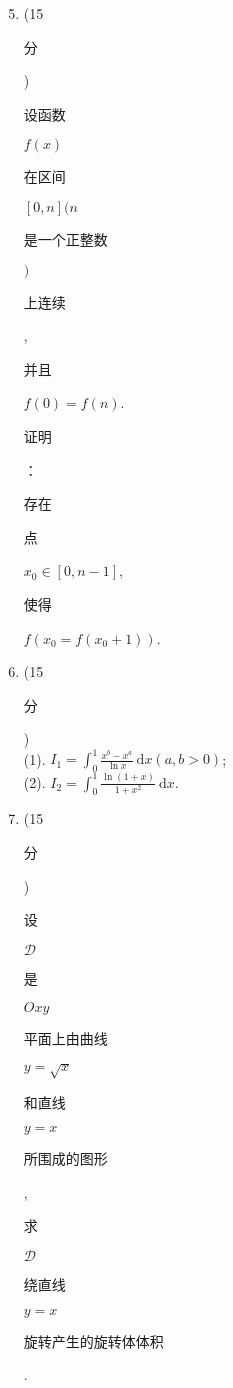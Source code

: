 \documentclass[10pt]{article}
\begin{document}
\begin{enumerate}
  \setcounter{enumi}{4}
  \item (15 \begin{CJK}{UTF8}{mj}分\end{CJK}) \begin{CJK}{UTF8}{mj}设函数\end{CJK} $f(x)$ \begin{CJK}{UTF8}{mj}在区间\end{CJK} $[0, n](n$ \begin{CJK}{UTF8}{mj}是一个正整数\end{CJK} $)$ \begin{CJK}{UTF8}{mj}上连续\end{CJK}, \begin{CJK}{UTF8}{mj}并且\end{CJK} $f(0)=f(n)$. \begin{CJK}{UTF8}{mj}证明\end{CJK}：\begin{CJK}{UTF8}{mj}存在\end{CJK} \begin{CJK}{UTF8}{mj}点\end{CJK} $x_{0} \in[0, n-1]$, \begin{CJK}{UTF8}{mj}使得\end{CJK} $f\left(x_{0}=f\left(x_{0}+1\right)\right)$.

  \item (15 \begin{CJK}{UTF8}{mj}分\end{CJK})\\
(1). $I_{1}=\int_{0}^{1} \frac{x^{b}-x^{a}}{\ln x} \mathrm{~d} x(a, b>0)$;\\
(2). $I_{2}=\int_{0}^{1} \frac{\ln (1+x)}{1+x^{2}} \mathrm{~d} x$.

  \item (15 \begin{CJK}{UTF8}{mj}分\end{CJK}) \begin{CJK}{UTF8}{mj}设\end{CJK} $\mathscr{D}$ \begin{CJK}{UTF8}{mj}是\end{CJK} $O x y$ \begin{CJK}{UTF8}{mj}平面上由曲线\end{CJK} $y=\sqrt{x}$ \begin{CJK}{UTF8}{mj}和直线\end{CJK} $y=x$ \begin{CJK}{UTF8}{mj}所围成的图形\end{CJK}, \begin{CJK}{UTF8}{mj}求\end{CJK} $\mathscr{D}$ \begin{CJK}{UTF8}{mj}绕直线\end{CJK} $y=x$ \begin{CJK}{UTF8}{mj}旋转产生的旋转体体积\end{CJK}.


\end{enumerate}
\end{document}
